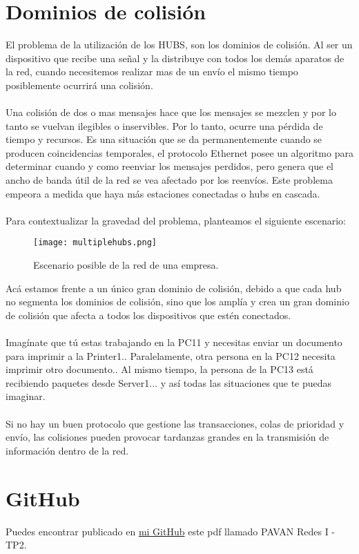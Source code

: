 \documentclass{article}
\begin{document}
\section{Dominios de colisión}
El problema de la utilización de los HUBS, son los dominios de colisión. Al ser un dispositivo que recibe una señal y la distribuye con todos los demás aparatos de la red, cuando necesitemos realizar mas de un envío el mismo tiempo posiblemente ocurrirá una colisión.
\\\\
Una colisión de dos o mas mensajes hace que los mensajes se mezclen y por lo tanto se vuelvan ilegibles o inservibles. Por lo tanto, ocurre una pérdida de tiempo y recursos. 
Es una situación que se da permanentemente cuando se producen coincidencias temporales, el protocolo Ethernet posee un algoritmo para determinar cuando y como reenviar los mensajes perdidos, pero genera que el ancho de banda útil de la red se vea afectado por los reenvíos.
Este problema empeora a medida que haya más estaciones conectadas o hubs en cascada.
\\\\
Para contextualizar la gravedad del problema, planteamos el siguiente escenario:
\begin{figure}[H]
    \centering
    \texttt{[image: multiplehubs.png]}
    \caption{Escenario posible de la red de una empresa.}
    \label{fig:multiplehubs}
\end{figure}
Acá estamos frente a un único gran dominio de colisión, debido a que cada hub no segmenta los dominios de colisión, sino que los amplía y crea un gran dominio de colisión que afecta a todos los dispositivos que estén conectados.
\\\\
Imagínate que tú estas trabajando en la PC11 y necesitas enviar un documento para imprimir a la Printer1.. Paralelamente, otra persona en la PC12 necesita imprimir otro documento.. Al mismo tiempo, la persona de la PC13 está recibiendo paquetes desde Server1... y así todas las situaciones que te puedas imaginar.
\\\\
Si no hay un buen protocolo que gestione las transacciones, colas de prioridad y envío, las colisiones pueden provocar tardanzas grandes en la transmisión de información dentro de la red.

\section{GitHub}
Puedes encontrar publicado en \href{https://github.com/martinpavan1/redes1}{mi GitHub} este pdf llamado PAVAN Redes I - TP2.
\end{document}
